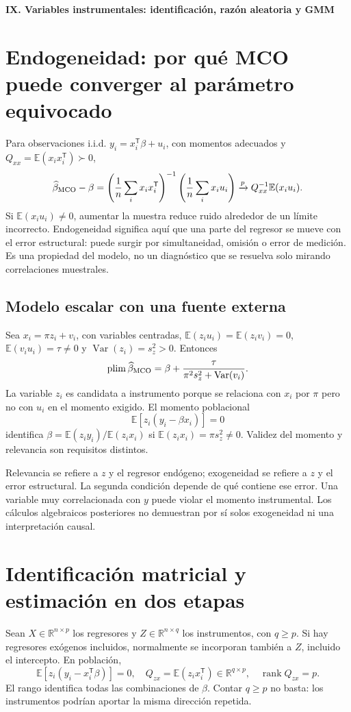 \documentclass[11pt,a4paper]{article}
\newcommand{\R}{\mathbb R}
\newcommand{\E}{\mathbb E}
\newcommand{\T}{^{\mathsf T}}
\DeclareMathOperator{\Var}{Var}
\DeclareMathOperator{\rank}{rank}
\theoremstyle{definition}
\newcommand{\parte}[1]{\par\bigskip\Needspace{8\baselineskip}\begin{center}{\Large\bfseries\color{azul}#1}\end{center}}
\begin{document}
\parte{IX. Variables instrumentales: identificación, razón aleatoria y GMM}
\section{Endogeneidad: por qué MCO puede converger al parámetro equivocado}
Para observaciones i.i.d. $y_i=x_i\T\beta+u_i$, con momentos adecuados y $Q_{xx}=\E(x_ix_i\T)\succ0$,
\[
\widehat\beta_{\rm MCO}-\beta
=\left(\frac1n\sum_ix_ix_i\T\right)^{-1}\left(\frac1n\sum_ix_iu_i\right)
\xrightarrow{p}Q_{xx}^{-1}\E(x_iu_i).
\]
Si $\E(x_iu_i)\ne0$, aumentar la muestra reduce ruido alrededor de un límite incorrecto. Endogeneidad significa aquí que una parte del regresor se mueve con el error estructural: puede surgir por simultaneidad, omisión o error de medición. Es una propiedad del modelo, no un diagnóstico que se resuelva solo mirando correlaciones muestrales.
\subsection{Modelo escalar con una fuente externa}
Sea $x_i=\pi z_i+v_i$, con variables centradas, $\E(z_iu_i)=\E(z_iv_i)=0$, $\E(v_iu_i)=\tau\ne0$ y $\Var(z_i)=s_z^2>0$. Entonces
\[
\operatorname{plim}\widehat\beta_{\rm MCO}
=\beta+\frac{\tau}{\pi^2s_z^2+\Var(v_i)}.
\]
La variable $z_i$ es candidata a instrumento porque se relaciona con $x_i$ por $\pi$ pero no con $u_i$ en el momento exigido. El momento poblacional
\[
\E[z_i(y_i-\beta x_i)]=0
\]
identifica $\beta=\E(z_iy_i)/\E(z_ix_i)$ si $\E(z_ix_i)=\pi s_z^2\ne0$. Validez del momento y relevancia son requisitos distintos.
\begin{cuidado}
Relevancia se refiere a $z$ y el regresor endógeno; exogeneidad se refiere a $z$ y el error estructural. La segunda condición depende de qué contiene ese error. Una variable muy correlacionada con $y$ puede violar el momento instrumental. Los cálculos algebraicos posteriores no demuestran por sí solos exogeneidad ni una interpretación causal.
\end{cuidado}

\section{Identificación matricial y estimación en dos etapas}
Sean $X\in\R^{n\times p}$ los regresores y $Z\in\R^{n\times q}$ los instrumentos, con $q\ge p$. Si hay regresores exógenos incluidos, normalmente se incorporan también a $Z$, incluido el intercepto. En población,
\[
\E[z_i(y_i-x_i\T\beta)]=0,\quad
Q_{zx}=\E(z_ix_i\T)\in\R^{q\times p},\quad\rank Q_{zx}=p.
\]
El rango identifica todas las combinaciones de $\beta$. Contar $q\ge p$ no basta: los instrumentos podrían aportar la misma dirección repetida.
\end{document}
